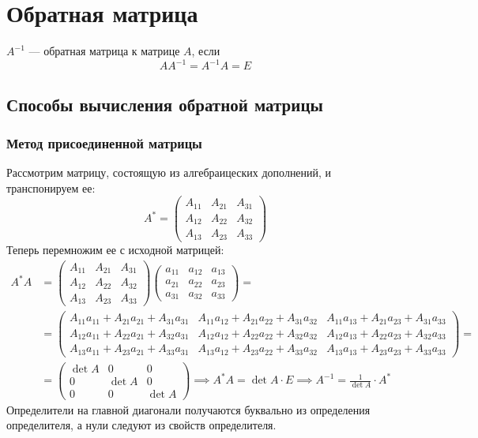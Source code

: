 \documentclass[12pt, a4paper]{article}
\begin{document}
    \section{Обратная матрица}
    \begin{definition}
        \( A^{-1} \) --- обратная матрица к матрице \( A \), если \[
            A A^{-1} = A^{-1}A = E
        \] 
    \end{definition}
    \subsection{Способы вычисления обратной матрицы}
    \subsubsection{Метод присоединенной матрицы}
    Рассмотрим матрицу, состоящую из алгебраицеских дополнений, и транспонируем ее: \[
        A^{*} = \begin{pmatrix} A_{11} & A_{21} & A_{31} \\ A_{12} & A_{22}& A_{32} \\ A_{13} & A_{23} & A_{33} \end{pmatrix}  
    \]Теперь перемножим ее с исходной матрицей:
    \begin{align*}
        A^{*}A &= \begin{pmatrix} A_{11} & A_{21} & A_{31} \\ A_{12} & A_{22}& A_{32} \\ A_{13} & A_{23} & A_{33} \end{pmatrix}  \begin{pmatrix} a_{11} & a_{12}& a_{13} \\ a_{21} & a_{22} & a_{23} \\ a_{31} &a_{32} & a_{33} \end{pmatrix}  = \\
                                        &= \begin{pmatrix} A_{11}a_{11} + A_{21}a_{21} + A_{31}a_{31} & A_{11}a_{12} + A_{21}a_{22} + A_{31}a_{32} & A_{11}a_{13} + A_{21}a_{23} + A_{31}a_{33}\\ A_{12}a_{11} + A_{22}a_{21} + A_{32}a_{31} & A_{12}a_{12} + A_{22}a_{22} + A_{32}a_{32} & A_{12}a_{13} + A_{22}a_{23} + A_{32}a_{33}\\
        A_{13}a_{11} + A_{23}a_{21} + A_{33}a_{31} & A_{13}a_{12} + A_{23}a_{22} + A_{33}a_{32} & A_{13}a_{13} + A_{23}a_{23} + A_{33}a_{33}\end{pmatrix} = \\
                                        &= \begin{pmatrix} \det A & 0 & 0 \\
                                        0 & \det A & 0 \\
                                        0 & 0 &\det A
                                    \end{pmatrix} \implies A^{*}A = \det A \cdot E \implies A^{-1} = \frac{1}{\det A} \cdot A^{*}   
    \end{align*}
    Определители на главной диагонали получаются буквально из определения определителя, а нули следуют из свойств определителя.
\end{document}
